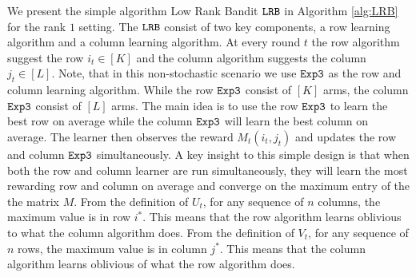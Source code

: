 


%

We present the simple algorithm Low Rank Bandit ${\tt LRB}$ in Algorithm \ref{alg:LRB} for the rank $1$ setting. The ${\tt LRB}$ consist of two key components, a row learning algorithm and a column learning algorithm. At every round $t$ the row algorithm suggest the row $i_t\in [K]$ and the column algorithm suggests the column $j_t\in [L]$. Note, that in this non-stochastic scenario we use ${\tt Exp3}$ as the row and column learning algorithm. While the row ${\tt Exp3}$ consist of $[K]$ arms, the column ${\tt Exp3}$ consist of $[L]$ arms. The main idea is to use the row ${\tt Exp3}$ to learn the best row on average while the column ${\tt Exp3}$ will learn the best column on average. The learner then observes the reward $M_t(i_t, j_t)$ and updates the row and column ${\tt Exp3}$ simultaneously. A key insight to this simple design is that when both the row and column learner are run simultaneously, they will learn the most rewarding row and column on average and converge on the maximum entry of the the matrix $M$. From the definition of $U_t$, for any sequence of $n$ columns, the maximum value is in row $i^\ast$. This means that the row algorithm learns oblivious to what the column algorithm does. From the definition of $V_t$, for any sequence of $n$ rows, the maximum value is in column $j^\ast$. This means that the column algorithm learns oblivious of what the row algorithm does.



